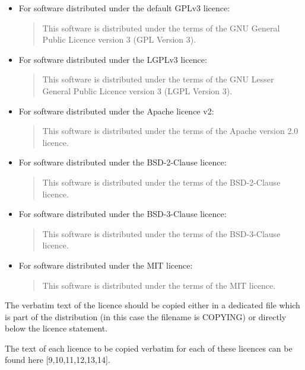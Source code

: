 \documentclass[12pt,a4paper]{article}
\begin{document}
\begin{itemize}
\item For software distributed under the default GPLv3 licence\cite{[9]}:
\begin{quote}
This software is distributed under the terms of the GNU General Public Licence version 3 (GPL Version 3).
\end{quote}
\item For software distributed under the LGPLv3 licence\cite{[10]}:
\begin{quote}
This software is distributed under the terms of the GNU Lesser General Public Licence version 3 (LGPL Version 3).
\end{quote}
\item For software distributed under the Apache licence v2\cite{[11]}:
\begin{quote}
This software is distributed under the terms of the Apache version 2.0 licence.
\end{quote}
\item For software distributed under the BSD-2-Clause licence\cite{[12]}:
\begin{quote}
This software is distributed under the terms of the BSD-2-Clause licence.
\end{quote}
\item For software distributed under the BSD-3-Clause licence\cite{[13]}:
\begin{quote}
This software is distributed under the terms of the BSD-3-Clause licence.
\end{quote}
\item For software distributed under the MIT licence\cite{[14]}:
\begin{quote}
This software is distributed under the terms of the MIT licence.
\end{quote}
\end{itemize}

The verbatim text of the licence should be copied either in a dedicated file which is part of the distribution (in this case the filename is COPYING) or directly below the licence statement.

The text of each licence to be copied verbatim for each of these licences can be found here [9,10,11,12,13,14].
\end{document}
